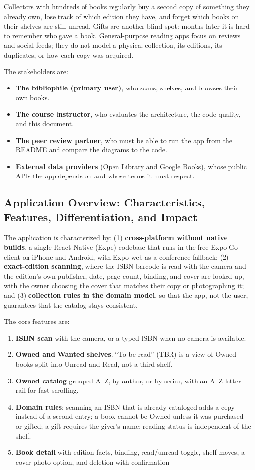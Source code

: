 \documentclass[12pt]{article}
\begin{document}
Collectors with hundreds of books regularly buy a second copy of something they already own, lose track of which edition they have, and forget which books on their shelves are still unread. Gifts are another blind spot: months later it is hard to remember who gave a book. General-purpose reading apps focus on reviews and social feeds; they do not model a physical collection, its editions, its duplicates, or how each copy was acquired.

The stakeholders are:
\begin{itemize}
    \item \textbf{The bibliophile (primary user)}, who scans, shelves, and browses their own books.
    \item \textbf{The course instructor}, who evaluates the architecture, the code quality, and this document.
    \item \textbf{The peer review partner}, who must be able to run the app from the README and compare the diagrams to the code.
    \item \textbf{External data providers} (Open Library and Google Books), whose public APIs the app depends on and whose terms it must respect.
\end{itemize}

\subsection{Application Overview: Characteristics, Features, Differentiation, and Impact}

The application is characterized by: (1) \textbf{cross-platform without native builds}, a single React Native (Expo) codebase that runs in the free Expo Go client on iPhone and Android, with Expo web as a conference fallback; (2) \textbf{exact-edition scanning}, where the ISBN barcode is read with the camera and the edition's own publisher, date, page count, binding, and cover are looked up, with the owner choosing the cover that matches their copy or photographing it; and (3) \textbf{collection rules in the domain model}, so that the app, not the user, guarantees that the catalog stays consistent.

The core features are:
\begin{enumerate}
    \item \textbf{ISBN scan} with the camera, or a typed ISBN when no camera is available.
    \item \textbf{Owned and Wanted shelves}. ``To be read'' (TBR) is a view of Owned books split into Unread and Read, not a third shelf.
    \item \textbf{Owned catalog} grouped A--Z, by author, or by series, with an A--Z letter rail for fast scrolling.
    \item \textbf{Domain rules}: scanning an ISBN that is already cataloged adds a copy instead of a second entry; a book cannot be Owned unless it was purchased or gifted; a gift requires the giver's name; reading status is independent of the shelf.
    \item \textbf{Book detail} with edition facts, binding, read/unread toggle, shelf moves, a cover photo option, and deletion with confirmation.
\end{enumerate}
\end{document}
